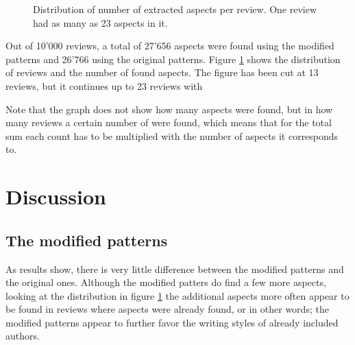 \documentclass[a4paper,11pt]{kth-mag}
\begin{document}
\begin{figure}
  \centering
  \caption{Distribution of number of extracted aspects per review. One review had as many as 23 aspects in it.}
  \label{fig:extr_count}
\end{figure}

Out of 10'000 reviews, a total of 27'656 aspects were found using the modified patterns
and 26'766 using the original patterns.
Figure \ref{fig:extr_count} shows the distribution of reviews and the number of
found aspects. The figure has been cut at 13 reviews, but it continues up to 23 reviews
with 

Note that the graph does not show how many aspects were found,
but in how many reviews a certain number of were found, which means that for the
total sum each count has to be multiplied with the number of aspects it corresponds to.

\section{Discussion}
\subsection{The modified patterns}
As results show, there is very little difference between the modified patterns and
the original ones. Although the modified patters do find a few more aspects, looking
at the distribution in figure \ref{fig:extr_count} the additional aspects more often
appear to be found in reviews where aspects were already found, or in other words;
the modified patterns appear to further favor the writing styles of already included authors.
\end{document}
